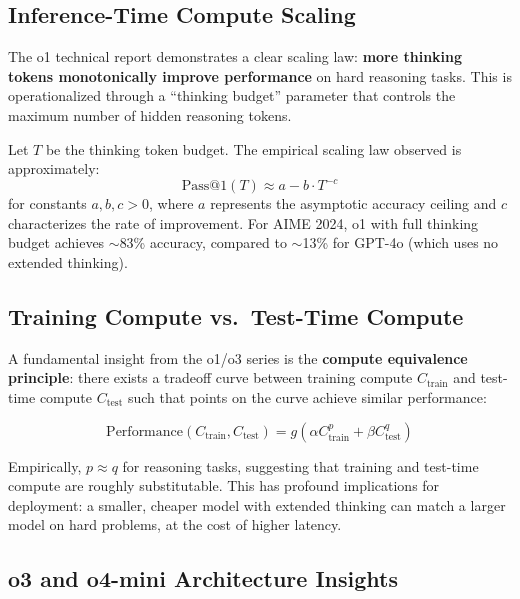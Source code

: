\subsection{Inference-Time Compute Scaling}
\label{inference-time-compute-scaling}

The o1 technical report demonstrates a clear scaling law: \textbf{more thinking tokens monotonically improve performance} on hard reasoning tasks. This is operationalized through a ``thinking budget'' parameter that controls the maximum number of hidden reasoning tokens.

Let $T$ be the thinking token budget. The empirical scaling law observed is approximately: 
\begin{equation}
    \text{Pass@1}(T) \approx a - b \cdot T^{-c}
\end{equation}
 for constants $a, b, c > 0$, where $a$ represents the asymptotic accuracy ceiling and $c$ characterizes the rate of improvement. For AIME 2024, o1 with full thinking budget achieves $\sim$83\% accuracy, compared to $\sim$13\% for GPT-4o (which uses no extended thinking).

\subsection{Training Compute vs.~Test-Time Compute}
\label{training-compute-vs.-test-time-compute}

A fundamental insight from the o1/o3 series is the \textbf{compute equivalence principle}: there exists a tradeoff curve between training compute $C_{\text{train}}$ and test-time compute $C_{\text{test}}$ such that points on the curve achieve similar performance:

\begin{equation}
    \text{Performance}(C_{\text{train}}, C_{\text{test}}) = g\!\left(\alpha C_{\text{train}}^{p} + \beta C_{\text{test}}^{q}\right)
\end{equation}

Empirically, $p \approx q$ for reasoning tasks, suggesting that training and test-time compute are roughly substitutable. This has profound implications for deployment: a smaller, cheaper model with extended thinking can match a larger model on hard problems, at the cost of higher latency.

\subsection{o3 and o4-mini Architecture Insights}
\label{o3-and-o4-mini-architecture-insights}

